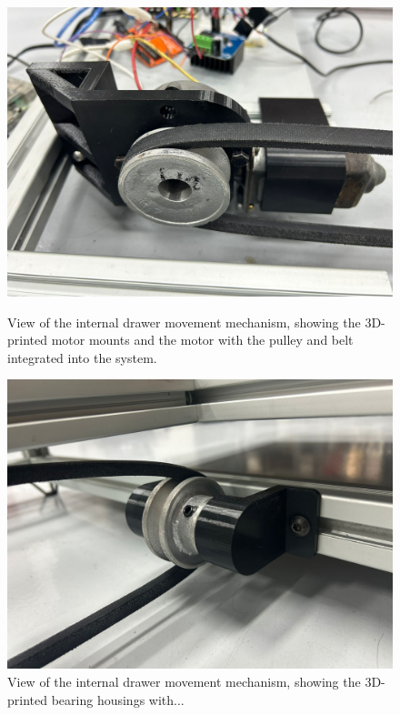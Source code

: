 \begin{figure}[H]
    \centering
    \begin{minipage}{0.49\textwidth}
        \centering
        \includegraphics[width=\textwidth]{MECANISMO/MOTOR_MECANISMO.jpg}
        \caption{View of the internal drawer movement mechanism, showing the 3D-printed motor mounts and the motor with the pulley and belt integrated into the system.}
        \label{fig:imagen1}
    \end{minipage}%
    \hfill
    \begin{minipage}{0.49\textwidth}
        \centering
        \includegraphics[width=\textwidth]{MECANISMO/MECANISMO_CHUMACERAS.jpg}
        \caption{View of the internal drawer movement mechanism, showing the 3D-printed bearing housings with...}

\end{minipage}
\end{figure}
